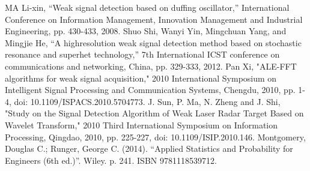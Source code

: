 \documentclass[conference]{IEEEtran}
\begin{document}

\begin{thebibliography}{00}
 MA Li-xin, “Weak signal detection based on duffing oscillator,” International Conference on Information Management, Innovation Management and Industrial Engineering, pp. 430-433, 2008.
 Shuo Shi, Wanyi Yin, Mingchuan Yang, and Mingjie He, “A highresolution weak signal detection method based on stochastic resonance and superhet technology,” 7th International ICST conference on communications and networking, China, pp. 329-333, 2012.
 Pan Xi, "ALE-FFT algorithms for weak signal acquisition," 2010 International Symposium on Intelligent Signal Processing and Communication Systems, Chengdu, 2010, pp. 1-4, doi: 10.1109/ISPACS.2010.5704773.
 J. Sun, P. Ma, N. Zheng and J. Shi, "Study on the Signal Detection Algorithm of Weak Laser Radar Target Based on Wavelet Transform," 2010 Third International Symposium on Information Processing, Qingdao, 2010, pp. 225-227, doi: 10.1109/ISIP.2010.146.
 Montgomery, Douglas C.; Runger, George C. (2014). “Applied Statistics and Probability for Engineers (6th ed.)”. Wiley. p. 241. ISBN 9781118539712.
\end{thebibliography}
\end{document}
